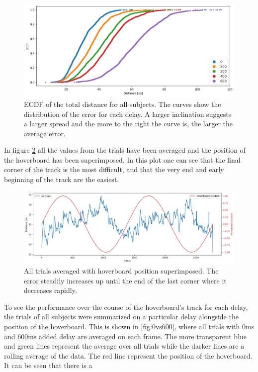 \documentclass[nofilelist]{cslthse-msc}
\begin{document}
\begin{figure}[!hbt]
   \centering
   \includegraphics[scale=0.5]{images/ecdf.png} 
   \caption{ECDF of the total distance for all subjects. The curves show the distribution of the error for each delay. A larger inclination suggests a larger spread and the more to the right the curve is, the larger the average error.}
   \label{fig:ecdf}
\end{figure}

In figure \ref{fig:hoverboard-pos} all the values from the trials have been averaged and the position of the hoverboard has been superimposed. In this plot one can see that the final corner of the track is the most difficult, and that the very end and early beginning of the track are the easiest. 

\begin{figure}[!hbt]
   \centering
   \includegraphics[scale=0.4]{images/hoverboard-pos.png} 
   \caption{All trials averaged with hoverboard position superimposed. The error steadily increases up until the end of the last corner where it decreases rapidly.}
   \label{fig:hoverboard-pos}
\end{figure}

To see the performance over the course of the hoverboard's track for each delay, the trials of all subjects were summarized on a particular delay alongside the position of the hoverboard. This is shown in \ref{fig:0vs600}, where all trials with 0ms and 600ms added delay are averaged on each frame. The more transparent blue and green lines represent the average over all trials while the darker lines are a rolling average of the data. The red line represent the position of the hoverboard.
It can be seen that there is a    
\end{document}

